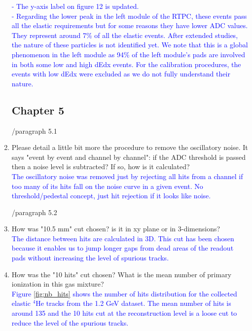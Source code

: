 \documentclass[a4paper,11pt,twoside]{article}
\begin{document}
\begin{enumerate}
\textcolor{blue}{- The y-axis label on figure 12 is updated.\\}
\textcolor{blue}{- Regarding the lower peak in the left module of the RTPC, 
   these events pass all the elastic requirements but for some reasons they 
   have lower ADC values.  They represent around 7\% of all the elastic events.  
   After extended studies, the nature of these particles is not identified yet.  
   We note that this is a global phenomenon in the left module as 94\% of the 
   left module's pads are involved in both some low and high dEdx events. For 
   the calibration procedures, the events with low dEdx were excluded as we do 
not fully understand their nature.} 

\subsection*{ Chapter 5}
        /paragraph 5.1	
     
\item Please detail a little bit more the procedure to remove the oscillatory 
   noise. It says "event by event and channel by channel": if the ADC threshold 
   is passed then a noise level is subtracted? If so, how is it calculated?\\
\textcolor{blue}{The oscillatory noise was removed just by rejecting all hits 
from a channel if too many of its hits fall on the noise curve in a given 
event. No threshold/pedestal concept, just hit rejection if it looks like 
noise. } 

/paragraph 5.2
\item How was "10.5 mm" cut chosen? is it in xy plane or in 3-dimensions?\\
\textcolor{blue}{The distance between hits are calculated in 3D. This cut has 
been chosen because it enables us to jump longer gaps from dead areas of the 
readout pads without increasing the level of spurious tracks.} 

\item How was the "10 hits" cut chosen? What is the mean number of primary 
   ionization in this gas mixture?\\
   \textcolor{blue}{Figure \ref{fig:nb_hits} shows the number of hits 
   distribution for the collected elastic $^4$He tracks from the 1.2 GeV 
dataset. The mean number of hits is around 135 and the 10 hits cut at the 
reconstruction level is a loose cut to reduce the level of the spurious 
tracks.}


\end{enumerate}
\end{document}
